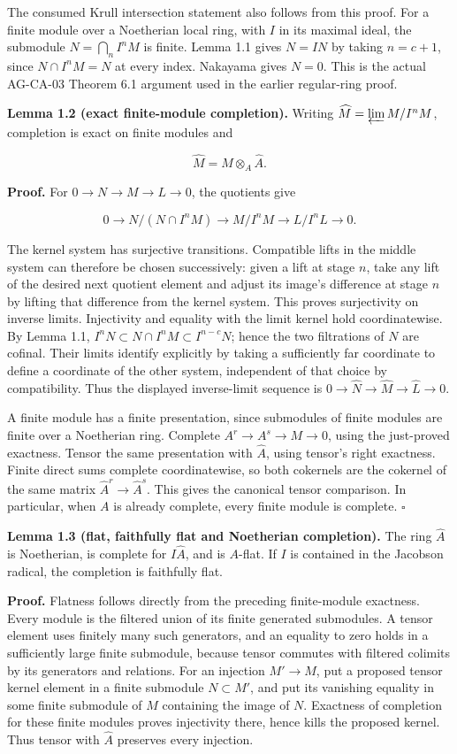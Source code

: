 \documentclass[11pt,a4paper,openany]{report}
\begin{document}
The consumed Krull intersection statement also follows from this proof. For a finite module over a Noetherian local ring, with \(I\) in its maximal ideal, the submodule \(N=\bigcap_n I^nM\) is finite. Lemma 1.1 gives \(N=IN\) by taking \(n=c+1\), since \(N\cap I^nM=N\) at every index. Nakayama gives \(N=0\). This is the actual AG-CA-03 Theorem 6.1 argument used in the earlier regular-ring proof.

\textbf{Lemma 1.2 (exact finite-module completion).} Writing \(\widehat M=\varprojlim M/I^nM\), completion is exact on finite modules and

\[
\widehat M=M\otimes_A\widehat A.
\]

\textbf{Proof.} For \(0\to N\to M\to L\to0\), the quotients give

\[
0\to N/(N\cap I^nM)\to M/I^nM\to L/I^nL\to0.
\]

The kernel system has surjective transitions. Compatible lifts in the middle system can therefore be chosen successively: given a lift at stage \(n\), take any lift of the desired next quotient element and adjust its image's difference at stage \(n\) by lifting that difference from the kernel system. This proves surjectivity on inverse limits. Injectivity and equality with the limit kernel hold coordinatewise. By Lemma 1.1, \(I^nN\subset N\cap I^nM\subset I^{n-c}N\); hence the two filtrations of \(N\) are cofinal. Their limits identify explicitly by taking a sufficiently far coordinate to define a coordinate of the other system, independent of that choice by compatibility. Thus the displayed inverse-limit sequence is \(0\to\widehat N\to\widehat M\to\widehat L\to0\).

A finite module has a finite presentation, since submodules of finite modules are finite over a Noetherian ring. Complete \(A^r\to A^s\to M\to0\), using the just-proved exactness. Tensor the same presentation with \(\widehat A\), using tensor's right exactness. Finite direct sums complete coordinatewise, so both cokernels are the cokernel of the same matrix \(\widehat A^r\to\widehat A^s\). This gives the canonical tensor comparison. In particular, when \(A\) is already complete, every finite module is complete. \(\square\)

\textbf{Lemma 1.3 (flat, faithfully flat and Noetherian completion).} The ring \(\widehat A\) is Noetherian, is complete for \(I\widehat A\), and is \(A\)-flat. If \(I\) is contained in the Jacobson radical, the completion is faithfully flat.

\textbf{Proof.} Flatness follows directly from the preceding finite-module exactness. Every module is the filtered union of its finite generated submodules. A tensor element uses finitely many such generators, and an equality to zero holds in a sufficiently large finite submodule, because tensor commutes with filtered colimits by its generators and relations. For an injection \(M'\to M\), put a proposed tensor kernel element in a finite submodule \(N\subset M'\), and put its vanishing equality in some finite submodule of \(M\) containing the image of \(N\). Exactness of completion for these finite modules proves injectivity there, hence kills the proposed kernel. Thus tensor with \(\widehat A\) preserves every injection.
\end{document}
